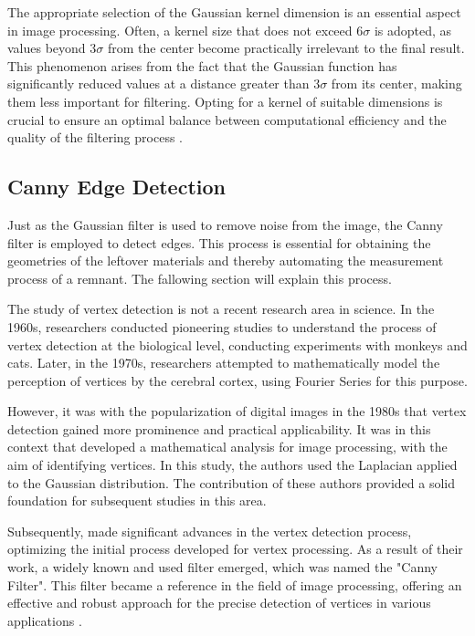 The appropriate selection of the Gaussian kernel dimension is an essential aspect in image processing. Often, a kernel size that does not exceed $6\sigma$ is adopted, as values beyond $3\sigma$ from the center become practically irrelevant to the final result. This phenomenon arises from the fact that the Gaussian function has significantly reduced values at a distance greater than $3\sigma$ from its center, making them less important for filtering. Opting for a kernel of suitable dimensions is crucial to ensure an optimal balance between computational efficiency and the quality of the filtering process \cite{gonzalez_rafael_c_digital_2018}.



\subsection{Canny Edge Detection}\label{subsection:Canny-edge-detection}

Just as the Gaussian filter is used to remove noise from the image, the Canny filter is employed to detect edges. This process is essential for obtaining the geometries of the leftover materials and thereby automating the measurement process of a remnant. The fallowing section will explain this process. 

The study of vertex detection is not a recent research area in science. In the 1960s, researchers \textcite{hubel1968receptive} \cite{hubel1962} conducted pioneering studies to understand the process of vertex detection at the biological level, conducting experiments with monkeys and cats. Later, in the 1970s, researchers \textcite{daniel1971} attempted to mathematically model the perception of vertices by the cerebral cortex, using Fourier Series for this purpose.

However, it was with the popularization of digital images in the 1980s that vertex detection gained more prominence and practical applicability. It was in this context that \textcite{marr1980theory} developed a mathematical analysis for image processing, with the aim of identifying vertices. In this study, the authors used the Laplacian applied to the Gaussian distribution. The contribution of these authors provided a solid foundation for subsequent studies in this area.

Subsequently, \textcite{canny1986} made significant advances in the vertex detection process, optimizing the initial process developed for vertex processing. As a result of their work, a widely known and used filter emerged, which was named the "Canny Filter". This filter became a reference in the field of image processing, offering an effective and robust approach for the precise detection of vertices in various applications \cite{ding_canny_2001}.

